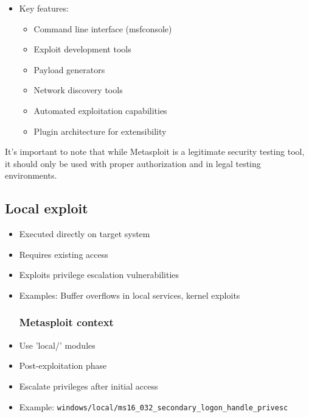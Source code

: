 \begin{itemize}
	\item Key features:
    \begin{itemize}
        \tightlist
		\item Command line interface (msfconsole)
		\item Exploit development tools
		\item Payload generators
		\item Network discovery tools
		\item Automated exploitation capabilities
		\item Plugin architecture for extensibility
    \end{itemize}
\end{itemize}

It's important to note that while Metasploit is a legitimate security testing tool, it should only be used with proper authorization and in legal testing environments.

\subsection{Local exploit}
\begin{itemize}
	\item Executed directly on target system
	\item Requires existing access
	\item Exploits privilege escalation vulnerabilities
	\item Examples: Buffer overflows in local services, kernel exploits
  \subsubsection*{Metasploit context}
	\item Use 'local/' modules
	\item Post-exploitation phase
	\item Escalate privileges after initial access
	\item Example: \lstinline|windows/local/ms16_032_secondary_logon_handle_privesc|
\end{itemize}

